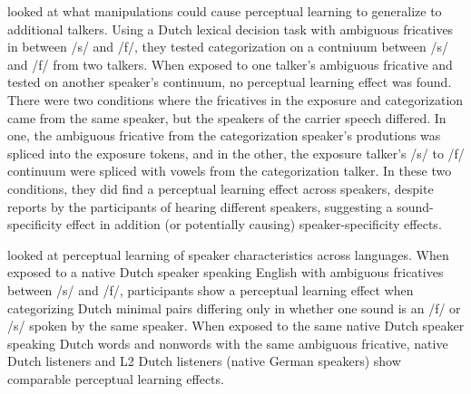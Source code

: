 \citet{Eisner2005} looked at what manipulations could cause perceptual learning to generalize to additional talkers.  
Using a Dutch lexical decision task with ambiguous fricatives in between /s/ and /f/, they tested categorization on a contniuum between /s/ and /f/ from two talkers.  
When exposed to one talker's ambiguous fricative and tested on another speaker's continuum, no perceptual learning effect was found.  
There were two conditions where the fricatives in the exposure and categorization came from the same speaker, but the speakers of the carrier speech differed.  
In one, the ambiguous fricative from the categorization speaker's produtions was spliced into the exposure tokens, and in the other, the exposure talker's /s/ to /f/ continuum were spliced with vowels from the categorization talker.
In these two conditions, they did find a perceptual learning effect across speakers, despite reports by the participants of hearing different speakers, suggesting a sound-specificity effect in addition (or potentially causing) speaker-specificity effects. 

\citet{Reinisch2013} looked at perceptual learning of speaker characteristics across languages.  
When exposed to a native Dutch speaker speaking English with ambiguous fricatives between /s/ and /f/, participants show a perceptual learning effect when categorizing Dutch minimal pairs differing only in whether one sound is an /f/ or /s/ spoken by the same speaker.  
When exposed to the same native Dutch speaker speaking Dutch words and nonwords with the same ambiguous fricative, native Dutch listeners and L2 Dutch listeners (native German speakers) show comparable perceptual learning effects.

